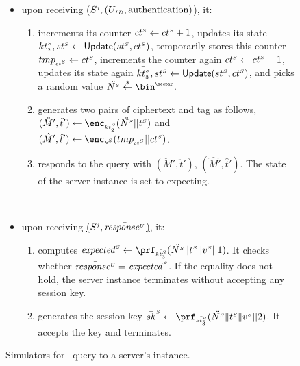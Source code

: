 \begin{figure}[H]
\begin{center}
\begin{tcolorbox}[enhanced,width=3.3in, left=0.1cm,
    drop fuzzy shadow southwest,
    colframe=black,colback=white]
{{\begin{itemize}[leftmargin=.4cm]
 \
 
 \item upon receiving  \underline{\send($S^{\scriptscriptstyle j}, (U_{\scriptscriptstyle ID},  \text{authentication})$)}, it:
 \begin{enumerate}
  \item  increments its counter  ${ct}^{\scriptscriptstyle S} \gets {ct}^{\scriptscriptstyle S} + 1$, updates its state  $\bar{{kt}^{\scriptscriptstyle S}_{\scriptscriptstyle 2}}, {st}^{\scriptscriptstyle S} \gets \mathsf{Update}({st}^{\scriptscriptstyle S}, {ct}^{\scriptscriptstyle S})$,  temporarily stores this counter ${tmp}_{\scriptscriptstyle{ct}^{\scriptscriptstyle S}} \gets {ct}^{\scriptscriptstyle S}$, increments the counter again ${ct}^{\scriptscriptstyle S} \gets {ct}^{\scriptscriptstyle S} + 1$, updates its state again $\bar{{kt}^{\scriptscriptstyle S}_{\scriptscriptstyle 3}}, {st}^{\scriptscriptstyle S} \gets \mathsf{Update}({st}^{\scriptscriptstyle S}, {ct}^{\scriptscriptstyle S})$, and picks a random value $\ddot{\VS{\nonce}} \stackrel{\sss\$}\leftarrow \bin^{\sss\secpar}$.
  \item generates two pairs of ciphertext and tag as follows, $(\ddot M', \ddot t')\leftarrow \enc_{\sss\bar{\VS{\keyt_{\sss 2}}}}(\ddot{\VS{\nonce}} || \VS{\trans})$ and  $(\hat M', \hat t')\leftarrow \enc_{\sss\VS{k}}(\tmp_{\sss\VS{\counter}} || \VS{\counter})$. 
  \item responds to the query with $(\ddot M', \ddot t')$, $(\hat M', \hat t')$. The state of the server instance is set to expecting.
 \end{enumerate}
 
 \
 
 \item upon receiving  \underline{\send($S^{\scriptscriptstyle j},   \bar{\mathit{response}^{\scriptscriptstyle U}}$)}, it:
 \begin{enumerate}
 \item computes $\VS{\mathit{expected}} \gets \prf_{\sss\bar{\VS{\keyt_{\sss3}}}}(\ddot{\VS{\nonce}}  \| \VS{\trans} \| \VS{\verifier}|| 1)$. It checks whether  $ \bar{\mathit{response}^{\scriptscriptstyle U}}=\mathit{expected}^{\scriptscriptstyle S}$. If the equality does not hold, the server instance terminates without accepting any session key. 
  \item generates the session key $\bar {sk}^{\sss S} \gets \prf_{\sss\bar{\VS{\keyt_{\sss3}}}}(\ddot{\VS{\nonce}}  \| \VS{\trans} \| \VS{\verifier}|| 2)$. 
It accepts the key and terminates.
%
  \end{enumerate}
 \end{itemize} 
}}
\end{tcolorbox}
\end{center}
\caption{Simulators for \send\ query to  a server's instance.} 
\label{fig::Send-sim-to-server}
\end{figure}


